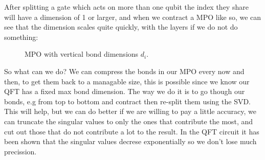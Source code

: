 \noindent
After splitting a gate which acts on more than one qubit the index they share will have a dimension of 1 or larger, and when we contract a MPO like so, we can see that the dimension scales quite quickly, with the layers if we do not do something: 
\begin{figure}[H]
    \centering 

    \caption{MPO with vertical bond dimensions $d_{i}.$}
    \label{fig:mpo_contraction}
\end{figure}
\noindent 
So what can we do? We can compress the bonds in our MPO every now and then, to get them back to a managable size, this is possible since we know our QFT has a fixed max bond dimension. The way we do it is to go though our bonds, e.g from top to bottom and contract then re-split them using the SVD. This will help, but we can do better if we are willing to pay a little accuracy, we can truncate the singular values to only the ones that contribute the most, and cut out those that do not contribute a lot to the result. In the QFT circuit it has been shown that the singular values decrese exponentially so we don't lose much precission.   

